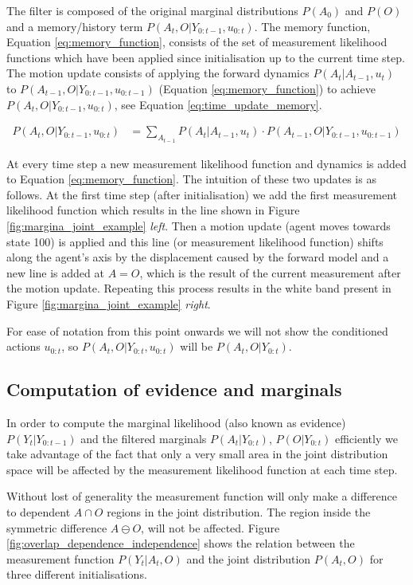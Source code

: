 The filter is composed of the original marginal distributions $P(A_0)$ and $P(O)$ and a memory/history term $P(A_{t},O|Y_{0:t-1},u_{0:t})$. 
The memory function, Equation \ref{eq:memory_function}, consists of the set of measurement likelihood functions which have been applied 
since initialisation up to the current time step. The motion update consists of applying the forward dynamics $P(A_t|A_{t-1},u_t)$ to 
$P(A_{t-1},O|Y_{0:t-1},u_{0:t-1})$ (Equation \ref{eq:memory_function}) to achieve $P(A_t,O|Y_{0:t-1},u_{0:t})$, see Equation \ref{eq:time_update_memory}. 

\begin{align}\label{eq:time_update_memory}
 P(A_t,O|Y_{0:t-1},u_{0:t}) &= \sum\limits_{A_{t-1}} P(A_t|A_{t-1},u_t) \cdot  P(A_{t-1},O|Y_{0:t-1},u_{0:t-1})
 \end{align}

At every time step a new measurement likelihood function and dynamics is added to Equation \ref{eq:memory_function}.
The intuition of these two updates is as follows. At the first time step (after initialisation) we add the first measurement 
likelihood function which results in the line shown in Figure \ref{fig:margina_joint_example} \textit{left}. 
Then a motion update (agent moves towards state 100) is applied and this line (or measurement
likelihood function) shifts along the agent's axis by the displacement caused by the forward model and a new line is added at $A=O$, 
which is the result of the current measurement after the motion update. Repeating this process results in the white band present 
in Figure \ref{fig:margina_joint_example} \textit{right}. 

For ease of notation from this point onwards we will not show the conditioned actions $u_{0:t}$, so $P(A_t,O|Y_{0:t},u_{0:t})$ will 
be $P(A_t,O|Y_{0:t})$. 

\subsection{Computation of evidence and marginals}

In order to compute the marginal likelihood (also known as evidence) $P(Y_t|Y_{0:t-1})$ and the filtered  marginals $P(A_t|Y_{0:t})$,
$P(O|Y_{0:t})$ efficiently we take advantage of the fact that only a very small area 
in the joint distribution space will be affected by the measurement likelihood function at each time step.

Without lost of generality the measurement function will only make a difference to dependent $A \cap O$ regions in the joint distribution. 
The region inside the symmetric difference $A \ominus O$, will not be affected.
Figure \ref{fig:overlap_dependence_independence} shows the relation between the measurement 
function $P(Y_t|A_t,O)$ and the joint distribution $P(A_t,O)$ for three different initialisations. 

